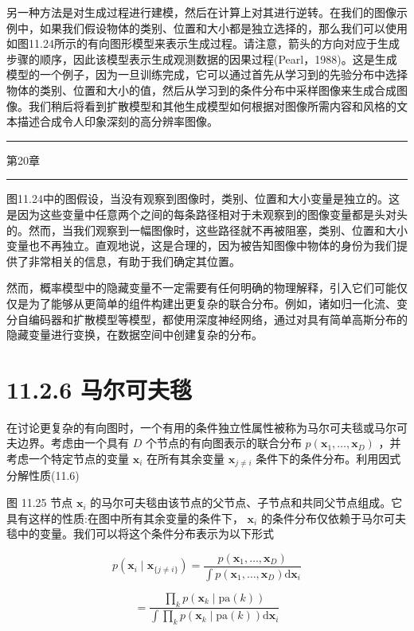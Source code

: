 \documentclass[10pt]{report}
\newcommand{\HRule}{\begin{center}\rule{0.9\linewidth}{0.2mm}\end{center}}
\begin{document}
另一种方法是对生成过程进行建模，然后在计算上对其进行逆转。在我们的图像示例中，如果我们假设物体的类别、位置和大小都是独立选择的，那么我们可以使用如图11.24所示的有向图形模型来表示生成过程。请注意，箭头的方向对应于生成步骤的顺序，因此该模型表示生成观测数据的因果过程(Pearl，1988)。这是生成模型的一个例子，因为一旦训练完成，它可以通过首先从学习到的先验分布中选择物体的类别、位置和大小的值，然后从学习到的条件分布中采样图像来生成合成图像。我们稍后将看到扩散模型和其他生成模型如何根据对图像所需内容和风格的文本描述合成令人印象深刻的高分辨率图像。

\HRule

第20章

\HRule

图11.24中的图假设，当没有观察到图像时，类别、位置和大小变量是独立的。这是因为这些变量中任意两个之间的每条路径相对于未观察到的图像变量都是头对头的。然而，当我们观察到一幅图像时，这些路径就不再被阻塞，类别、位置和大小变量也不再独立。直观地说，这是合理的，因为被告知图像中物体的身份为我们提供了非常相关的信息，有助于我们确定其位置。

然而，概率模型中的隐藏变量不一定需要有任何明确的物理解释，引入它们可能仅仅是为了能够从更简单的组件构建出更复杂的联合分布。例如，诸如归一化流、变分自编码器和扩散模型等模型，都使用深度神经网络，通过对具有简单高斯分布的隐藏变量进行变换，在数据空间中创建复杂的分布。

\section*{11.2.6 马尔可夫毯}

在讨论更复杂的有向图时，一个有用的条件独立性属性被称为马尔可夫毯或马尔可夫边界。考虑由一个具有 \(D\) 个节点的有向图表示的联合分布 \(p\left( {{\mathbf{x}}_{1},\ldots ,{\mathbf{x}}_{D}}\right)\) ，并考虑一个特定节点的变量 \({\mathbf{x}}_{i}\) 在所有其余变量 \({\mathbf{x}}_{j \neq  i}\) 条件下的条件分布。利用因式分解性质(11.6)

图 11.25 节点 \({\mathbf{x}}_{i}\) 的马尔可夫毯由该节点的父节点、子节点和共同父节点组成。它具有这样的性质:在图中所有其余变量的条件下， \({\mathbf{x}}_{i}\) 的条件分布仅依赖于马尔可夫毯中的变量。我们可以将这个条件分布表示为以下形式

\[
p\left( {{\mathbf{x}}_{i} \mid  {\mathbf{x}}_{\{ j \neq  i\} }}\right)  = \frac{p\left( {{\mathbf{x}}_{1},\ldots ,{\mathbf{x}}_{D}}\right) }{\int p\left( {{\mathbf{x}}_{1},\ldots ,{\mathbf{x}}_{D}}\right) \mathrm{d}{\mathbf{x}}_{i}}
\]

\[
= \frac{\mathop{\prod }\limits_{k}p\left( {{\mathbf{x}}_{k} \mid  \mathrm{{pa}}\left( k\right) }\right) }{\int \mathop{\prod }\limits_{k}p\left( {{\mathbf{x}}_{k} \mid  \mathrm{{pa}}\left( k\right) }\right) \mathrm{d}{\mathbf{x}}_{i}}
\]
\end{document}
